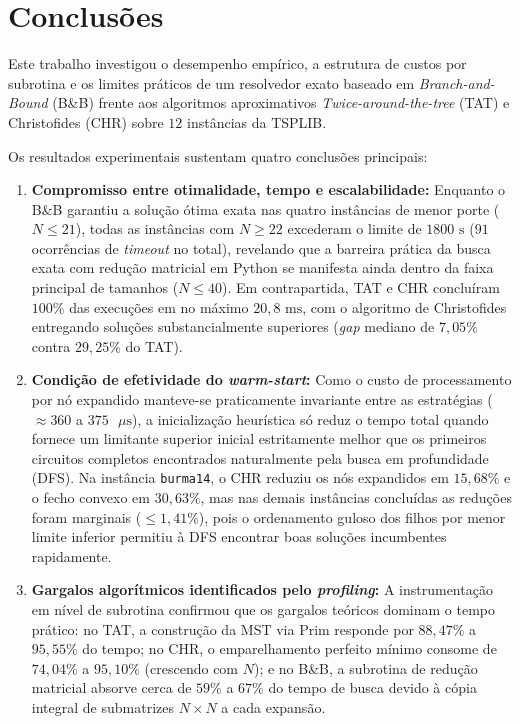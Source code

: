 \documentclass[12pt]{article}
\begin{document}
\section{Conclusões}

Este trabalho investigou o desempenho empírico, a estrutura de custos por subrotina e os limites práticos de um resolvedor exato baseado em \textit{Branch-and-Bound} (B\&B) frente aos algoritmos aproximativos \textit{Twice-around-the-tree} (TAT) e Christofides (CHR) sobre $12$ instâncias da TSPLIB.

Os resultados experimentais sustentam quatro conclusões principais:
\begin{enumerate}
    \item \textbf{Compromisso entre otimalidade, tempo e escalabilidade:} Enquanto o B\&B garantiu a solução ótima exata nas quatro instâncias de menor porte ($N \le 21$), todas as instâncias com $N \ge 22$ excederam o limite de $1800\text{ s}$ ($91$ ocorrências de \textit{timeout} no total), revelando que a barreira prática da busca exata com redução matricial em Python se manifesta ainda dentro da faixa principal de tamanhos ($N \le 40$). Em contrapartida, TAT e CHR concluíram $100\%$ das execuções em no máximo $20{,}8\text{ ms}$, com o algoritmo de Christofides entregando soluções substancialmente superiores (\textit{gap} mediano de $7{,}05\%$ contra $29{,}25\%$ do TAT).
    \item \textbf{Condição de efetividade do \textit{warm-start}:} Como o custo de processamento por nó expandido manteve-se praticamente invariante entre as estratégias ($\approx 360$ a $375\text{ }\mu\text{s}$), a inicialização heurística só reduz o tempo total quando fornece um limitante superior inicial estritamente melhor que os primeiros circuitos completos encontrados naturalmente pela busca em profundidade (DFS). Na instância \texttt{burma14}, o CHR reduziu os nós expandidos em $15{,}68\%$ e o fecho convexo em $30{,}63\%$, mas nas demais instâncias concluídas as reduções foram marginais ($\le 1{,}41\%$), pois o ordenamento guloso dos filhos por menor limite inferior permitiu à DFS encontrar boas soluções incumbentes rapidamente.
    \item \textbf{Gargalos algorítmicos identificados pelo \textit{profiling}:} A instrumentação em nível de subrotina confirmou que os gargalos teóricos dominam o tempo prático: no TAT, a construção da MST via Prim responde por $88{,}47\%$ a $95{,}55\%$ do tempo; no CHR, o emparelhamento perfeito mínimo consome de $74{,}04\%$ a $95{,}10\%$ (crescendo com $N$); e no B\&B, a subrotina de redução matricial absorve cerca de $59\%$ a $67\%$ do tempo de busca devido à cópia integral de submatrizes $N \times N$ a cada expansão.

\end{enumerate}
\end{document}
